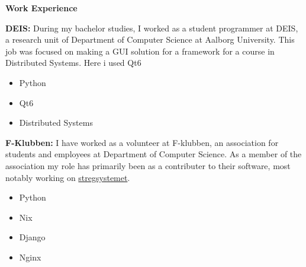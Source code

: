 \documentclass[a4paper, 14pt]{article}
\newcommand{\myitem}[1]{\item[\color{myorange}$\circ$]#1}
\newcommand{\newcvsection}[2]{
    \noindent\huge \textbf{#1} \color{myorange}\hrulefill\color{black}
    
    \normalsize
    #2    
    \vspace{.1cm}
}
\begin{document}
    \newcvsection{Work Experience}{
        \begin{itemize}
            \begin{minipage}{.70\textwidth}
                \myitem{
                    \textbf{DEIS: } During my bachelor studies, I worked as a student programmer at DEIS, a research unit of Department of Computer Science at Aalborg University. 
                    This job was focused on making a GUI solution for a framework for a course in Distributed Systems. Here i used Qt6

                }
            \end{minipage}
            \hfill
            \begin{minipage}{.20\textwidth}
                \begin{mybox}
                    \begin{itemize}
                        \item[$\cdot$] Python
                        \item[$\cdot$] Qt6
                        \item[$\cdot$] Distributed Systems
                    \end{itemize}
                \end{mybox}
            \end{minipage}
                
            \begin{minipage}{.70\textwidth}
                \myitem{
                    \textbf{F-Klubben: } I have worked as a volunteer at F-klubben, an association for students and employees at Department of Computer Science. 
                    As a member of the association my role has primarily been as a contributer to their software, most notably working on \href{https://github.com/f-klubben/stregsystemet}{stregsystemet}.
                }
            \end{minipage}
            \hfill
            \begin{minipage}{.20\textwidth}
                \begin{mybox}
                    \begin{itemize}
                        \item[$\cdot$] Python
                        \item[$\cdot$] Nix
                        \item[$\cdot$] Django
                        \item[$\cdot$] Nginx
                    \end{itemize}
                \end{mybox}
            \end{minipage}


\end{itemize}}
\end{document}
